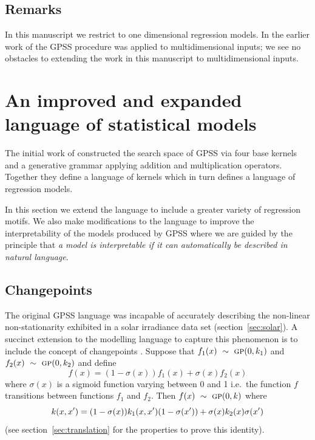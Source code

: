 \documentclass{article}
\def\ie{i.e.\ }
\begin{document}
\subsection{Remarks}
\label{sec:Remarks}
In this manuscript we restrict to one dimensional regression models.
In the earlier work of \cite{DuvLloGroetal13} the GPSS procedure was applied to multidimensional inputs; we see no obstacles to extending the work in this manuscript to multidimensional inputs.

\section{An improved and expanded language of statistical models}
\label{sec:improvements}
The initial work of \cite{DuvLloGroetal13} constructed the search space of GPSS via four base kernels and a generative grammar applying addition and multiplication operators.
Together they define a language of kernels which in turn defines a language of regression models.

In this section we extend the language to include a greater variety of regression motifs.
We also make modifications to the language to improve the interpretability of the models produced by GPSS where we are guided by the principle that \emph{a model is interpretable if it can automatically be described in natural language}.

\subsection{Changepoints}

The original GPSS language was incapable of accurately describing the non-linear non-stationarity exhibited in a solar irradiance data set (section~\ref{sec:solar}).
A succinct extension to the modelling language to capture this phenomenon is to include the concept of changepoints \citep[e.g.][]{garnett2010sequential, FoxDunson:NIPS2012}.
Suppose that $f_1(x) \ \sim\  {\textsc{gp}}{}(0, k_1)$ and $f_2(x) \ \sim\  {\textsc{gp}}{}(0, k_2)$ and define
\begin{equation}
f(x) = (1-\sigma(x))f_1(x) + \sigma(x)f_2(x)
\end{equation}
where $\sigma(x)$ is a sigmoid function varying between 0 and 1 \ie the function $f$ transitions between functions $f_1$ and $f_2$.
Then $f(x) \ \sim\  {\textsc{gp}}{}(0,k)$ where
\begin{equation}
\kernel(x,x') = (1-\sigma(x))k_1(x,x')(1-\sigma(x')) + \sigma(x)k_2(x)\sigma(x')
\label{eq:cp}
\end{equation}
(see section~\ref{sec:translation} for the properties to prove this identity).
\end{document}
